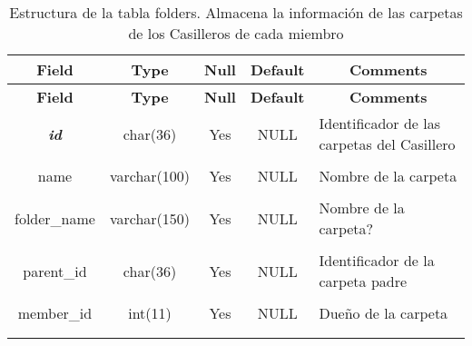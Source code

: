 %
%
\begin{longtable}{c c c c l}
	\multicolumn{1}{c}{\textbf{Field}} &
	\multicolumn{1}{c}{\textbf{Type}} &
	\multicolumn{1}{c}{\textbf{Null}} &
	\multicolumn{1}{c}{\textbf{Default}} &
	\multicolumn{1}{c}{\textbf{Comments}} \\ \hline \hline
\endfirsthead
	\multicolumn{1}{c}{\textbf{Field}} &
	\multicolumn{1}{c}{\textbf{Type}} &
	\multicolumn{1}{c}{\textbf{Null}} &
	\multicolumn{1}{c}{\textbf{Default}} &
	\multicolumn{1}{c}{\textbf{Comments}} \\ \hline \hline
\endhead \endfoot
	\textbf{\textit{id}} & char(36) & Yes &  NULL & \parbox[t]{0.35\textwidth}{Identificador de las carpetas del Casillero} \\ \\ \hline
	name & varchar(100) & Yes & NULL & \parbox[t]{0.35\textwidth}{Nombre de la carpeta} \\ \\ \hline 
	folder\_name & varchar(150) & Yes &  NULL & \parbox[t]{0.35\textwidth}{Nombre de la carpeta?} \\ \\ \hline
	parent\_id & char(36) & Yes & NULL & \parbox[t]{0.35\textwidth}{Identificador de la carpeta padre} \\ \\ \hline
	member\_id & int(11) & Yes & NULL & \parbox[t]{0.35\textwidth}{Dueño de la carpeta} \\ \\
 \caption[Estructura de la tabla folders]{Estructura de la tabla folders. Almacena la información de las carpetas de los Casilleros de cada miembro} \label{tab:locker_folders-structure} \\
\end{longtable}

